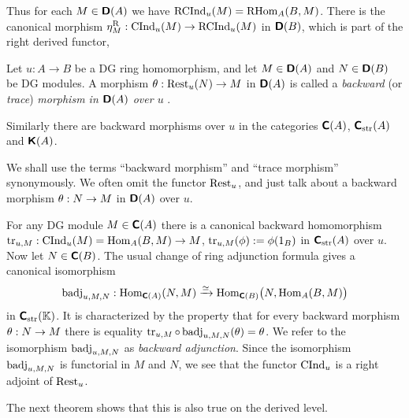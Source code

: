 Thus for each $M \in \boldsymbol{\mathsf{D}}(A)$ we have 
$\operatorname{RCInd}_u(M) = \operatorname{RHom}_{A}(B, M)$.
There is the canonical morphism 
$\eta^{\mathrm{R}}_{M} : \operatorname{CInd}_u(M) \to \operatorname{RCInd}_u(M)$
in $\boldsymbol{\mathsf{D}}(B)$, which is part of the right derived functor, 


\begin{dfn} \label{dfn:3110}
Let $u : A \to B$ be a DG ring homomorphism, and let 
$M \in \boldsymbol{\mathsf{D}}(A)$ and $N \in \boldsymbol{\mathsf{D}}(B)$ be DG modules.
A morphism
$\theta : \operatorname{Rest}_u(N) \to M$
in $\boldsymbol{\mathsf{D}}(A)$ is called a {\em backward} (or {\em trace}) {\em morphism in 
$\boldsymbol{\mathsf{D}}(A)$ over $u$}%
%
.

Similarly there are backward morphisms over $u$ in the categories 
$\boldsymbol{\mathsf{C}}(A)$, $\boldsymbol{\mathsf{C}}_{\mathrm{str}}(A)$ and $\boldsymbol{\mathsf{K}}(A)$.
\end{dfn}

We shall use the terms ``backward morphism'' and ``trace morphism'' 
synonymously. 
We often omit the functor $\operatorname{Rest}_u$, and just talk about a 
backward morphism $\theta : N \to M$ in $\boldsymbol{\mathsf{D}}(A)$  over $u$. 

For any DG module $M \in \boldsymbol{\mathsf{C}}(A)$ there is a canonical backward homomorphism
$\operatorname{tr}_{u, M} : \operatorname{CInd}_u(M) = \operatorname{Hom}_A(B, M) \to M$,
$\operatorname{tr}_{u, M}(\phi) := \phi(1_B)$ 
in $\boldsymbol{\mathsf{C}}_{\mathrm{str}}(A)$ over $u$. 
Now let $N \in \boldsymbol{\mathsf{C}}(B)$. The usual change of ring adjunction formula gives 
a canonical isomorphism 
\[ \operatorname{badj}_{u, M, N} : 
\operatorname{Hom}_{\boldsymbol{\mathsf{C}}(A)}(N, M) \xrightarrow{\simeq} 
\operatorname{Hom}_{\boldsymbol{\mathsf{C}}(B)} \bigl( N, \operatorname{Hom}_A(B, M) \bigr) \]
in $\boldsymbol{\mathsf{C}}_{\mathrm{str}}(\mathbb{K})$. It is characterized by the property that 
for every backward morphism $\theta : N \to M$ there is equality 
$\operatorname{tr}_{u, M} \circ \operatorname{badj}_{u, M, N}(\theta) = \theta$.
We refer to the isomorphism  $\operatorname{badj}_{u, M, N}$ as 
{\em backward adjunction}. 
Since the isomorphism $\operatorname{badj}_{u, M, N}$ is 
functorial in $M$ and $N$, we see that the functor $\operatorname{CInd}_u$ is a right 
adjoint of $\operatorname{Rest}_u$. 

The next theorem shows that this is also true on the derived level. 


